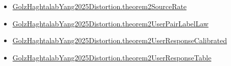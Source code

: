 \documentclass[10pt]{article}
\begin{document}
\begin{itemize}
\item \hyperlink{governing-declaration-5d4c92feb59536c0}{Golz\allowbreak{}Haghtalab\allowbreak{}Yang2025\allowbreak{}Distortion.\allowbreak{}theorem2\allowbreak{}Source\allowbreak{}Rate}
\item \hyperlink{governing-declaration-98c3ee9a11a59ef9}{Golz\allowbreak{}Haghtalab\allowbreak{}Yang2025\allowbreak{}Distortion.\allowbreak{}theorem2\allowbreak{}User\allowbreak{}Pair\allowbreak{}Label\allowbreak{}Law}
\item \hyperlink{governing-declaration-080b9388e51a6018}{Golz\allowbreak{}Haghtalab\allowbreak{}Yang2025\allowbreak{}Distortion.\allowbreak{}theorem2\allowbreak{}User\allowbreak{}Response\allowbreak{}Calibrated}
\item \hyperlink{governing-declaration-c5d0273cbd7ddcc9}{Golz\allowbreak{}Haghtalab\allowbreak{}Yang2025\allowbreak{}Distortion.\allowbreak{}theorem2\allowbreak{}User\allowbreak{}Response\allowbreak{}Table}
\end{itemize}
\end{document}
